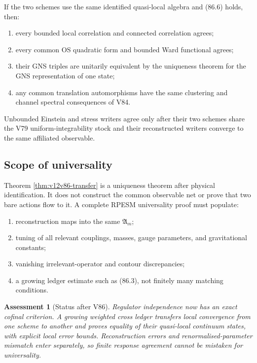\documentclass[11pt]{article}
\newtheorem{assessment}[theorem]{Assessment}
\theoremstyle{remark}
\begin{document}
If the two schemes use the same identified quasi-local algebra and
(86.6) holds, then:
\begin{enumerate}
\item every bounded local correlation and connected correlation
      agrees;
\item every common OS quadratic form and bounded Ward functional
      agrees;
\item their GNS triples are unitarily equivalent by the uniqueness
      theorem for the GNS representation of one state;
\item any common translation automorphisms have the same clustering
      and channel spectral consequences of V84.
\end{enumerate}
Unbounded Einstein and stress writers agree only after their two
schemes share the V79 uniform-integrability stock and their
reconstructed writers converge to the same affiliated observable.

\subsection{Scope of universality}

Theorem \ref{thm:v12v86-transfer} is a uniqueness theorem after
physical identification.  It does not construct the common
observable net or prove that two bare actions flow to it.  A complete
RPESM universality proof must populate:
\begin{enumerate}
\item reconstruction maps into the same
      \({\mathfrak A}_m\);
\item tuning of all relevant couplings, masses, gauge parameters, and
      gravitational constants;
\item vanishing irrelevant-operator and contour discrepancies;
\item a growing ledger estimate such as (86.3), not finitely many
      matching conditions.
\end{enumerate}

\begin{assessment}[Status after V86]
\label{ass:v12v86-status}
Regulator independence now has an exact cofinal criterion.  A growing
weighted cross ledger transfers local convergence from one scheme to
another and proves equality of their quasi-local continuum states,
with explicit local error bounds.  Reconstruction errors and
renormalised-parameter mismatch enter separately, so finite response
agreement cannot be mistaken for universality.
\end{assessment}
\end{document}
